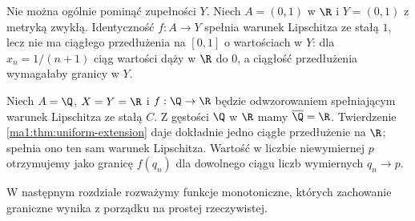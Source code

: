 \begin{przyklad}
\label{ma1:ex:uniform-extension-incomplete}
Nie można ogólnie pominąć zupełności $Y$. Niech $A=(0,1)$ w $\R$ i $Y=(0,1)$ z metryką zwykłą. Identyczność $f:A\to Y$ spełnia warunek Lipschitza ze stałą $1$, lecz nie ma ciągłego przedłużenia na $[0,1]$ o wartościach w $Y$: dla $x_n=1/(n+1)$ ciąg wartości dąży w $\R$ do $0$, a ciągłość przedłużenia wymagałaby granicy w $Y$.
\end{przyklad}
\begin{przyklad}
\label{ma1:ex:dense-extension}
Niech $A=\Q$, $X=Y=\R$ i $f:\Q\to\R$ będzie odwzorowaniem spełniającym warunek Lipschitza ze stałą $C$. Z gęstości $\Q$ w $\R$ mamy $\overline{\Q}=\R$. Twierdzenie \ref{ma1:thm:uniform-extension} daje dokładnie jedno ciągłe przedłużenie na $\R$; spełnia ono ten sam warunek Lipschitza. Wartość w liczbie niewymiernej $p$ otrzymujemy jako granicę $f(q_n)$ dla dowolnego ciągu liczb wymiernych $q_n\to p$.
\end{przyklad}

W następnym rozdziale rozważymy funkcje monotoniczne, których zachowanie graniczne wynika z porządku na prostej rzeczywistej.
